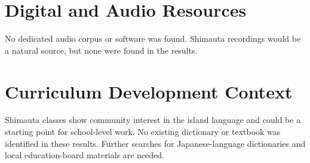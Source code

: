 \documentclass[12pt]{article}
\begin{document}
\section{Digital and Audio Resources}
No dedicated audio corpus or software was found. Shimauta recordings would be a natural source, but none were found in the results.

\section{Curriculum Development Context}
Shimauta classes show community interest in the island language and could be a starting point for school-level work. No existing dictionary or textbook was identified in these results. Further searches for Japanese-language dictionaries and local education-board materials are needed.
\end{document}
